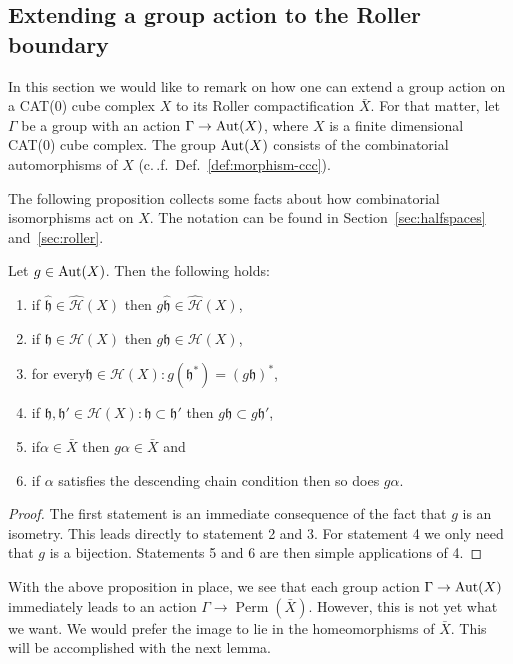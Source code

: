 \subsection{Extending a group action to the Roller boundary}
\label{sec:ga-roller}

In this section we would like to remark on how one can extend a group action on a CAT(0) cube complex \(X\) to its Roller compactification \(\bar X\). For that matter, let \(\Gamma\) be a group with an action \(\Gamma \to \operatorname{Aut}(X)\), where \(X\) is a finite dimensional CAT(0) cube complex. The group \(\operatorname{Aut}(X)\) consists of the combinatorial automorphisms of \(X\) (c.\,.f.\ Def.~\ref{def:morphism-ccc}).

The following proposition collects some facts about how combinatorial isomorphisms act on \(X\). The notation can be found in Section~\ref{sec:halfspaces} and~\ref{sec:roller}.

\begin{prop}
  Let \(g \in \operatorname{Aut}(X)\). Then the following holds:
  \begin{enumerate}
  \item if \(\mathfrak{\hat h} \in \mathcal{\hat H}(X)\) then \(g\mathfrak{\hat h} \in \mathcal{\hat H}(X)\),
  \item if \(\mathfrak{h} \in \mathcal{H}(X)\) then \( g\mathfrak{h} \in \mathcal{H}(X)\),
  \item for every\(\mathfrak{h} \in \mathcal{H}(X)\colon g(\mathfrak{h}^\ast) = (g\mathfrak{h})^\ast\),
  \item if \(\mathfrak{h,h'} \in \mathcal{H}(X)\colon \mathfrak{h} \subset \mathfrak{h'}\) then \(g\mathfrak{h} \subset g\mathfrak{h'}\),
  \item if\(\alpha \in \bar X\) then \(g\alpha \in \bar X\) and
  \item if \(\alpha\) satisfies the descending chain condition then so does \(g\alpha\).
  \end{enumerate}
\end{prop}

\begin{proof}
  The first statement is an immediate consequence of the fact that \(g\) is an isometry. This leads directly to statement 2 and 3. For statement 4 we only need that \(g\) is a bijection. Statements 5 and 6 are then simple applications of 4.
\end{proof}

With the above proposition in place, we see that each group action \(\Gamma \to \operatorname{Aut}(X)\) immediately leads to an action \(\Gamma \to \operatorname{Perm}(\bar X)\). However, this is not yet what we want. We would prefer the image to lie in the homeomorphisms of \(\bar X\). This will be accomplished with the next lemma.

